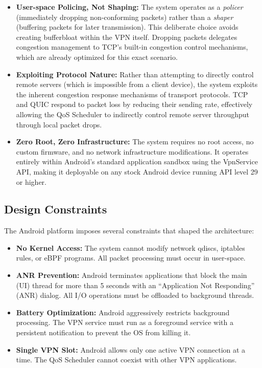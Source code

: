 \begin{itemize}[noitemsep]
    \item \textbf{User-space Policing, Not Shaping:} The system operates as a \textit{policer} (immediately dropping non-conforming packets) rather than a \textit{shaper} (buffering packets for later transmission). This deliberate choice avoids creating bufferbloat within the VPN itself. Dropping packets delegates congestion management to TCP's built-in congestion control mechanisms, which are already optimized for this exact scenario.
    \item \textbf{Exploiting Protocol Nature:} Rather than attempting to directly control remote servers (which is impossible from a client device), the system exploits the inherent congestion response mechanisms of transport protocols. TCP and QUIC respond to packet loss by reducing their sending rate, effectively allowing the QoS Scheduler to indirectly control remote server throughput through local packet drops.
    \item \textbf{Zero Root, Zero Infrastructure:} The system requires no root access, no custom firmware, and no network infrastructure modifications. It operates entirely within Android's standard application sandbox using the VpnService API, making it deployable on any stock Android device running API level 29 or higher.
\end{itemize}

\subsection{Design Constraints}

The Android platform imposes several constraints that shaped the architecture:

\begin{itemize}[noitemsep]
    \item \textbf{No Kernel Access:} The system cannot modify network qdiscs, iptables rules, or eBPF programs. All packet processing must occur in user-space.
    \item \textbf{ANR Prevention:} Android terminates applications that block the main (UI) thread for more than 5 seconds with an ``Application Not Responding'' (ANR) dialog. All I/O operations must be offloaded to background threads.
    \item \textbf{Battery Optimization:} Android aggressively restricts background processing. The VPN service must run as a foreground service with a persistent notification to prevent the OS from killing it.
    \item \textbf{Single VPN Slot:} Android allows only one active VPN connection at a time. The QoS Scheduler cannot coexist with other VPN applications.
\end{itemize}

